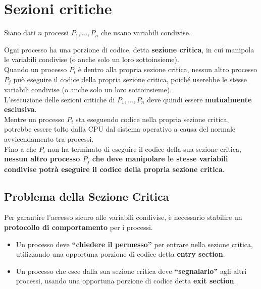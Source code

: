 \section{Sezioni critiche}
Siano dati $n$ processi $P_1, \ldots, P_n$ che usano variabili condivise. 

 Ogni processo ha una porzione di codice, detta \textbf{sezione critica}, in cui manipola le variabili condivise (o anche solo un loro sottoinsieme).\\
 Quando un processo $P_i$ è dentro alla propria sezione critica, nessun altro processo $P_j$ può eseguire il codice della propria sezione critica, poiché userebbe le stesse variabili condivise (o anche solo un loro sottoinsieme).\\
 L'esecuzione delle sezioni critiche di $P_1, \ldots, P_n$ deve quindi essere \textbf{mutualmente esclusiva}.\\
Mentre un processo $P_i$ sta eseguendo codice nella propria sezione critica, potrebbe essere tolto dalla CPU dal sistema operativo a causa del normale avvicendamento tra processi. \\
 Fino a che $P_i$ non ha terminato di eseguire il codice della sua sezione critica, \textbf{nessun altro processo $P_j$ che deve manipolare le stesse variabili condivise potrà eseguire il codice della propria sezione critica}.\\

\subsection{Problema della Sezione Critica}
Per garantire l'accesso sicuro alle variabili condivise, è necessario stabilire un \textbf{protocollo di comportamento} per i processi. 

\begin{itemize}
    \item Un processo deve \textbf{“chiedere il permesso”} per entrare nella sezione critica, utilizzando una opportuna porzione di codice detta \textbf{entry section}.
    \item Un processo che esce dalla sua sezione critica deve \textbf{“segnalarlo”} agli altri processi, usando una opportuna porzione di codice detta \textbf{exit section}.
\end{itemize}

